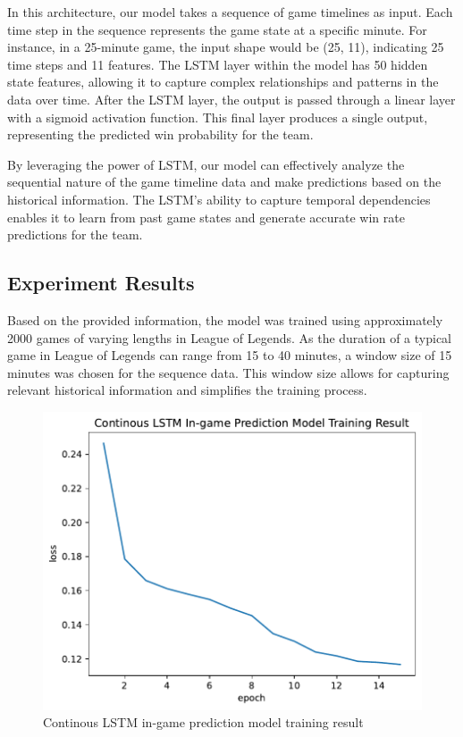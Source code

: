 \documentclass[11pt,a4paper,oneside]{report}
\begin{document}
In this architecture, our model takes a sequence of game timelines as input. Each time step in the sequence represents the game state at a specific minute. For instance, in a 25-minute game, the input shape would be (25, 11), indicating 25 time steps and 11 features. The LSTM layer within the model has 50 hidden state features, allowing it to capture complex relationships and patterns in the data over time. After the LSTM layer, the output is passed through a linear layer with a sigmoid activation function. This final layer produces a single output, representing the predicted win probability for the team.

By leveraging the power of LSTM, our model can effectively analyze the sequential nature of the game timeline data and make predictions based on the historical information. The LSTM's ability to capture temporal dependencies enables it to learn from past game states and generate accurate win rate predictions for the team.

\subsection{Experiment Results}

Based on the provided information, the model was trained using approximately 2000 games of varying lengths in League of Legends. As the duration of a typical game in League of Legends can range from 15 to 40 minutes, a window size of 15 minutes was chosen for the sequence data. This window size allows for capturing relevant historical information and simplifies the training process.

\begin{figure}[htbp]
  \centering
  \includegraphics[height=0.4\textheight]{assets/lstm_train_accuracy.pdf}
  \caption{Continous LSTM in-game prediction model training result}
  \label{fig:lstm_train_accuracy}
\end{figure}
\end{document}
